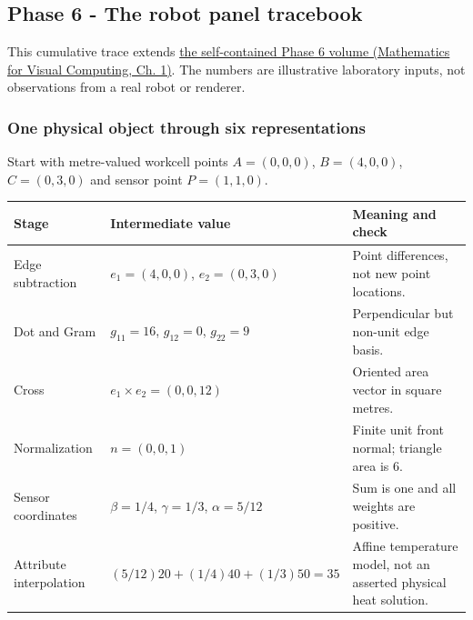 \subsection{Phase 6 - The robot panel tracebook}\label{appendix-92ff77d4dfdc-phase-6---the-robot-panel-tracebook}

This cumulative trace extends \href{../02-Mathematics-for-Visual-Computing/main.pdf\#nameddest=01-foundations-i-ch017-the-panel-gives-us-a-reason-to-learn}{the self-contained Phase 6 volume (Mathematics for Visual Computing, Ch. 1)}. The numbers are illustrative laboratory inputs, not observations from a real robot or renderer.

\subsubsection{One physical object through six representations}\label{appendix-92ff77d4dfdc-one-physical-object-through-six-representations}

Start with metre-valued workcell points \(A=(0,0,0)\), \(B=(4,0,0)\), \(C=(0,3,0)\) and sensor point \(P=(1,1,0)\).

{\def\LTcaptype{none} %
\begin{longtable}[]{@{}
  >{\raggedright\arraybackslash}p{}
  >{\raggedright\arraybackslash}p{}
  >{\raggedright\arraybackslash}p{}@{}}
\toprule\noalign{}
\begin{minipage}[b]{\linewidth}\raggedright
Stage
\end{minipage} & \begin{minipage}[b]{\linewidth}\raggedright
Intermediate value
\end{minipage} & \begin{minipage}[b]{\linewidth}\raggedright
Meaning and check
\end{minipage} \\
\midrule\noalign{}
\endhead
\bottomrule\noalign{}
\endlastfoot
Edge subtraction & \(e_1=(4,0,0)\), \(e_2=(0,3,0)\) & Point differences, not new point locations. \\
Dot and Gram & \(g_{11}=16\), \(g_{12}=0\), \(g_{22}=9\) & Perpendicular but non-unit edge basis. \\
Cross & \(e_1\times e_2=(0,0,12)\) & Oriented area vector in square metres. \\
Normalization & \(n=(0,0,1)\) & Finite unit front normal; triangle area is \(6\). \\
Sensor coordinates & \(\beta=1/4\), \(\gamma=1/3\), \(\alpha=5/12\) & Sum is one and all weights are positive. \\
Attribute interpolation & \((5/12)20+(1/4)40+(1/3)50=35\) & Affine temperature model, not an asserted physical heat solution. \\
\end{longtable}
}

